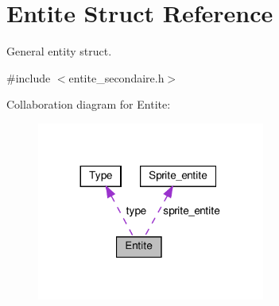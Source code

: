 \hypertarget{structEntite}{}\section{Entite Struct Reference}
\label{structEntite}


General entity struct.  




{\ttfamily \#include $<$entite\+\_\+secondaire.\+h$>$}



Collaboration diagram for Entite\+:
\nopagebreak
\begin{figure}[H]
\begin{center}
\leavevmode
\includegraphics[width=212pt]{structEntite__coll__graph}
\end{center}
\end{figure}
